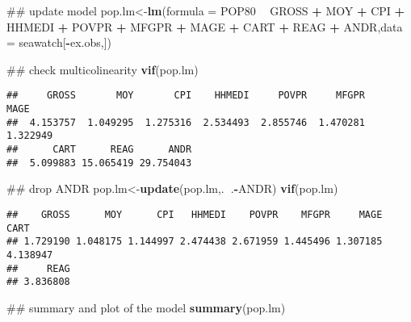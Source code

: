 \documentclass[]{article}
\newenvironment{Shaded}{\begin{snugshade}}{\end{snugshade}}
\newcommand{\KeywordTok}[1]{\textcolor[rgb]{0.13,0.29,0.53}{\textbf{#1}}}
\newcommand{\DataTypeTok}[1]{\textcolor[rgb]{0.13,0.29,0.53}{#1}}
\newcommand{\StringTok}[1]{\textcolor[rgb]{0.31,0.60,0.02}{#1}}
\newcommand{\OperatorTok}[1]{\textcolor[rgb]{0.81,0.36,0.00}{\textbf{#1}}}
\newcommand{\NormalTok}[1]{#1}
\begin{document}
\begin{Shaded}
\begin{Highlighting}[]
\NormalTok{## update model}
\NormalTok{pop.lm<-}\KeywordTok{lm}\NormalTok{(}\DataTypeTok{formula =}\NormalTok{ POP80 }\OperatorTok{~}\StringTok{ }\NormalTok{GROSS }\OperatorTok{+}\StringTok{ }\NormalTok{MOY }\OperatorTok{+}\StringTok{ }\NormalTok{CPI }\OperatorTok{+}\StringTok{ }\NormalTok{HHMEDI }\OperatorTok{+}\StringTok{ }\NormalTok{POVPR }\OperatorTok{+}\StringTok{ }\NormalTok{MFGPR }\OperatorTok{+}\StringTok{ }
\StringTok{    }\NormalTok{MAGE }\OperatorTok{+}\StringTok{ }\NormalTok{CART }\OperatorTok{+}\StringTok{ }\NormalTok{REAG }\OperatorTok{+}\StringTok{ }\NormalTok{ANDR,}\DataTypeTok{data =}\NormalTok{ seawatch[}\OperatorTok{-}\NormalTok{ex.obs,])}

\NormalTok{## check multicolinearity}
\KeywordTok{vif}\NormalTok{(pop.lm)}
\end{Highlighting}
\end{Shaded}

\begin{verbatim}
##     GROSS       MOY       CPI    HHMEDI     POVPR     MFGPR      MAGE 
##  4.153757  1.049295  1.275316  2.534493  2.855746  1.470281  1.322949 
##      CART      REAG      ANDR 
##  5.099883 15.065419 29.754043
\end{verbatim}

\begin{Shaded}
\begin{Highlighting}[]
\NormalTok{## drop ANDR}
\NormalTok{pop.lm<-}\KeywordTok{update}\NormalTok{(pop.lm,.}\OperatorTok{~}\NormalTok{.}\OperatorTok{-}\NormalTok{ANDR)}
\KeywordTok{vif}\NormalTok{(pop.lm)}
\end{Highlighting}
\end{Shaded}

\begin{verbatim}
##    GROSS      MOY      CPI   HHMEDI    POVPR    MFGPR     MAGE     CART 
## 1.729190 1.048175 1.144997 2.474438 2.671959 1.445496 1.307185 4.138947 
##     REAG 
## 3.836808
\end{verbatim}

\begin{Shaded}
\begin{Highlighting}[]
\NormalTok{## summary and plot of the model}
\KeywordTok{summary}\NormalTok{(pop.lm)}
\end{Highlighting}
\end{Shaded}
\end{document}
